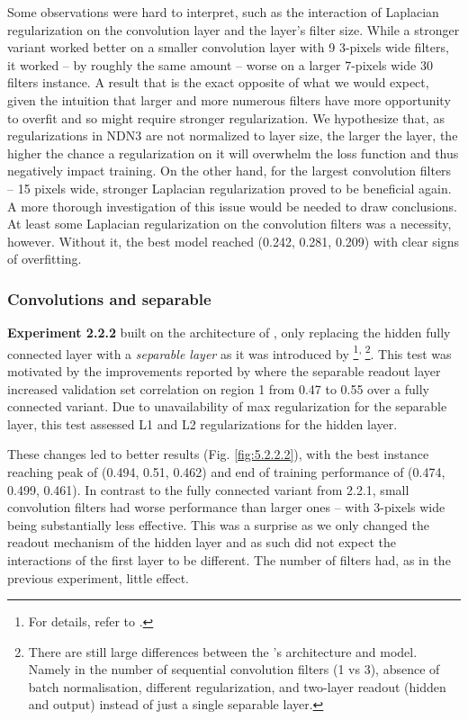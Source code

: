 Some observations were hard to interpret, such as the interaction of Laplacian regularization on the convolution layer and the layer’s filter size. While a stronger variant worked better on a smaller convolution layer with 9 3-pixels wide filters, it worked -- by roughly the same amount -- worse on a larger 7-pixels wide 30 filters instance. A result that is the exact opposite of what we would expect, given the intuition that larger and more numerous filters have more opportunity to overfit and so might require stronger regularization. We hypothesize that, as regularizations in NDN3 are not normalized to layer size, the larger the layer, the higher the chance a regularization on it will overwhelm the loss function and thus negatively impact training. On the other hand, for the largest convolution filters -- 15 pixels wide, stronger Laplacian regularization proved to be beneficial again. A more thorough investigation of this issue would be needed to draw conclusions. At least some Laplacian regularization on the convolution filters was a necessity, however. Without it, the best model reached (0.242, 0.281, 0.209) with clear signs of overfitting.

\subsubsection{Convolutions and separable}\label{ex:2.2.2}

\textbf{Experiment 2.2.2} built on the architecture of , only replacing the hidden fully connected layer with a \textit{separable layer} as it was introduced by \cite{klindt}\footnote{For details, refer to .}$^{,\thinspace}$\footnote{There are still large differences between the 's architecture and \cite{klindt} model. Namely in the number of sequential convolution filters (1 vs 3), absence of batch normalisation, different regularization, and two-layer readout (hidden and output) instead of just a single separable layer.}. This test was motivated by the improvements reported by \citeauthor{klindt} where the separable readout layer increased validation set correlation on region 1 from 0.47 to 0.55 over a fully connected variant. Due to unavailability of max regularization for the separable layer, this test assessed L1 and L2 regularizations for the hidden layer.

These changes led to better results (Fig. \ref{fig:5.2.2.2}), with the best instance reaching peak of (0.494, 0.51, 0.462) and end of training performance of (0.474, 0.499, 0.461). In contrast to the fully connected variant from 2.2.1, small convolution filters had worse performance than larger ones -- with 3-pixels wide being substantially less effective. This was a surprise as we only changed the readout mechanism of the hidden layer and as such did not expect the interactions of the first layer to be different. The number of filters had, as in the previous experiment, little effect.


